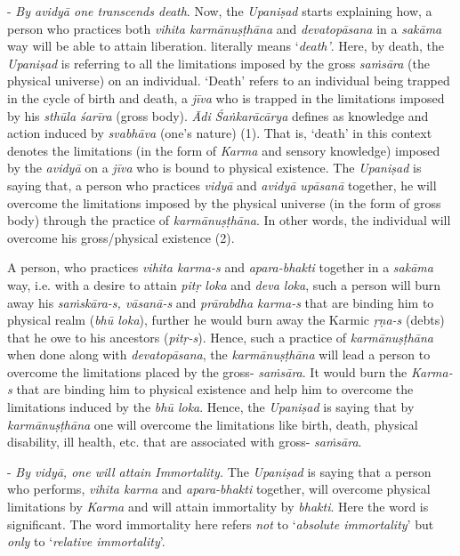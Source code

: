 - \emph{By avidyā one transcends death}. Now, the \emph{Upaniṣad} starts explaining how, a person who practices both \emph{vihita karmānuṣṭhāna} and \emph{devatopāsana} in a \emph{sakāma} way will be able to attain liberation.  literally means `\emph{death'}. Here, by death, the \emph{Upaniṣad} is referring to all the limitations imposed by the gross \emph{saṁsāra} (the physical universe) on an individual. `Death' refers to an individual being trapped in the cycle of birth and death, a \emph{jīva} who is trapped in the limitations imposed by his \emph{sthūla śarīra} (gross body). \emph{Ādi Śaṅkarācārya} defines  as knowledge and action induced by \emph{svabhāva} (one's nature) (1). That is, `death' in this context denotes the limitations (in the form of \emph{Karma} and sensory knowledge) imposed by the \emph{avidyā} on a \emph{jīva} who is bound to physical existence. The \emph{Upaniṣad} is saying that, a person who practices \emph{vidyā} and \emph{avidyā upāsanā} together, he will overcome the limitations imposed by the physical universe (in the form of gross body) through the practice of \emph{karmānuṣṭhāna}. In other words, the individual will overcome his gross/physical existence (2).

A person, who practices \emph{vihita karma-s} and \emph{apara-bhakti} together in a \emph{sakāma} way, i.e. with a desire to attain \emph{pitṛ loka} and \emph{deva loka}, such a person will burn away his \emph{saṁskāra-s, vāsanā-s} and \emph{prārabdha karma-s} that are binding him to physical realm (\emph{bhū loka}), further he would burn away the Karmic \emph{ṛṇa-s} (debts) that he owe to his ancestors (\emph{pitṛ-s}). Hence, such a practice of \emph{karmānuṣṭhāna} when done along with \emph{devatopāsana}, the \emph{karmānuṣṭhāna} will lead a person to overcome the limitations placed by the gross- \emph{saṁsāra}. It would burn the \emph{Karma-s} that are binding him to physical existence and help him to overcome the limitations induced by the \emph{bhū loka}. Hence, the \emph{Upaniṣad} is saying that by \emph{karmānuṣṭhāna} one will overcome the limitations like birth, death, physical disability, ill health, etc. that are associated with gross- \emph{saṁsāra}.

- \emph{By vidyā, one will attain Immortality.} The \emph{Upaniṣad} is saying that a person who performs, \emph{vihita karma} and \emph{apara-bhakti} together, will overcome physical limitations by \emph{Karma} and will attain immortality by \emph{bhakti}. Here the word  is significant. The word immortality here refers \emph{not} to `\emph{absolute immortality}' but \emph{only} to `\emph{relative immortality}'.

